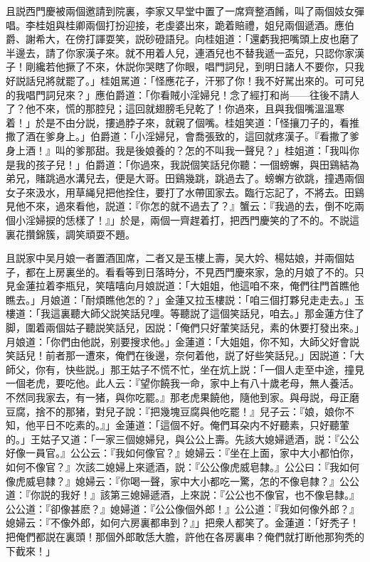 且説西門慶被兩個邀請到院裏，李家又早堂中置了一席齊整酒餚，叫了兩個妓女彈唱。李桂姐與桂卿兩個打扮迎接，老虔婆出來，跪着賠禮，姐兒兩個遞酒。應伯爵、謝希大，在傍打諢耍笑，説砂磴語兒。向桂姐道：「還虧我把嘴頭上皮也磨了半邊去，請了你家漢子來。就不用着人兒，連酒兒也不替我遞一盃兒，只認你家漢子！剛纔若他撅了不來，休説你哭瞎了你眼，唱門詞兒，到明日諸人不要你，只我好説話兒將就罷了。」桂姐駡道：「怪應花子，汗邪了你！我不好駡出來的。可可兒的我唱門詞兒來？」應伯爵道：「你看賊小淫婦兒！念了經打和尚——往後不請人了？他不來，慌的那腔兒；這回就翅膀毛兒乾了！你過來，且與我個嘴溫溫寒着！」於是不由分説，摟過脖子來，就親了個嘴。桂姐笑道：「怪攘刀子的，看推撒了酒在爹身上。」伯爵道：「小淫婦兒，會喬張致的，這回就疼漢子。『看撒了爹身上酒！』叫的爹那甜。我是後娘養的？怎的不叫我一聲兒？」桂姐道：「我叫你是我的孩子兒！」伯爵道：「你過來，我説個笑話兒你聽：一個螃蠏，與田鷄結為弟兄，賭跳過水溝兒去，便是大哥。田鷄幾跳，跳過去了。螃蠏方欲跳，撞遇兩個女子來汲水，用草䋲兒把他拴住，要打了水帶囬家去。臨行忘記了，不將去。田鷄見他不來，過來看他，説道：『你怎的就不過去了？』蟹云：『我過的去，倒不吃兩個小淫婦捩的恁樣了！』」於是，兩個一齊趕着打，把西門慶笑的了不的。不説這裏花攢錦簇，調笑頑耍不題。

且説家中吴月娘一者置酒囬席，二者又是玉樓上壽，吴大妗、楊姑娘，并兩個姑子，都在上房裏坐的。看看等到日落時分，不見西門慶來家，急的月娘了不的。只見金蓮拉着李瓶兒，笑嘻嘻向月娘説道：「大姐姐，他這咱不來，俺們往門首瞧他瞧去。」月娘道：「耐煩瞧他怎的？」金蓮又拉玉樓説：「咱三個打夥兒走走去。」玉樓道：「我這裏聽大師父説笑話兒哩。等聽説了這個笑話兒，咱去。」那金蓮方住了脚，圍着兩個姑子聽説笑話兒，因説：「俺們只好葷笑話兒，素的休要打發出來。」月娘道：「你們由他説，别要搜求他。」金蓮道：「大姐姐，你不知，大師父好會説笑話兒！前者那一遭來，俺們在後邊，奈何着他，説了好些笑話兒。」因説道：「大師父，你有，快些説。」那王姑子不慌不忙，坐在炕上説：「一個人走至中途，撞見一個老虎，要吃他。此人云：『望你饒我一命，家中上有八十歲老母，無人養活。不然同我家去，有一猪，與你吃罷。』那老虎果饒他，隨他到家。與母説，母正磨豆腐，捨不的那猪，對兒子說：『把幾塊豆腐與他吃罷！』兒子云：『娘，娘你不知，他平日不吃素的。』」金蓮道：「這個不好。俺們耳朶内不好聽素，只好聽葷的。」王姑子又道：「一家三個媳婦兒，與公公上壽。先該大媳婦遞酒，説：『公公好像一員官。』公公云：『我如何像官？』媳婦云：『坐在上面，家中大小都怕你，如何不像官？』次該二媳婦上來遞酒，説：『公公像虎威皂隸。』公公曰：『我如何像虎威皂隸？』媳婦云：『你喝一聲，家中大小都吃一驚，怎的不像皂隸？』公公道：『你説的我好！』該第三媳婦遞酒，上來説：『公公也不像官，也不像皂隸。』公公道：『卻像甚麽？』媳婦道：『公公像個外郎！』公公道：『我如何像外郎？』媳婦云：『不像外郎，如何六房裏都串到？』」把衆人都笑了。金蓮道：「好秃子！把俺們都説在裏頭！那個外郎敢恁大膽，許他在各房裏串？俺們就打断他那狗秃的下截來！」

